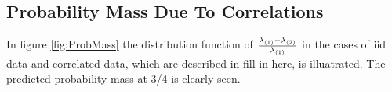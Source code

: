 \documentclass[11pt,reqno]{amsart}
\newcommand{\1}{\mathds{1}}
\newcommand{\0}{\boldsymbol{0}}
\newcommand{\4}{\mathchoice{\mskip1.5mu}{\mskip1.5mu}{}{}}
\newcommand{\5}{\mathchoice{\mskip-1.5mu}{\mskip-1.5mu}{}{}}
\newcommand{\2}{\penalty250\mskip\thickmuskip\mskip-\thinmuskip} %
\begin{document}
\subsection{Probability Mass Due To Correlations}
In figure \ref{fig:ProbMass} the distribution function of
${\lambda_{(1)} - \lambda_{(2)} \over \lambda_{(1)}}$ in the cases of
iid data and correlated data, which are described in {\color{red} fill
in here}, is illuatrated. The predicted probability mass at 3/4 is
clearly seen.
\begin{figure}[htb!]
  \centering
\end{figure}
\end{document}
